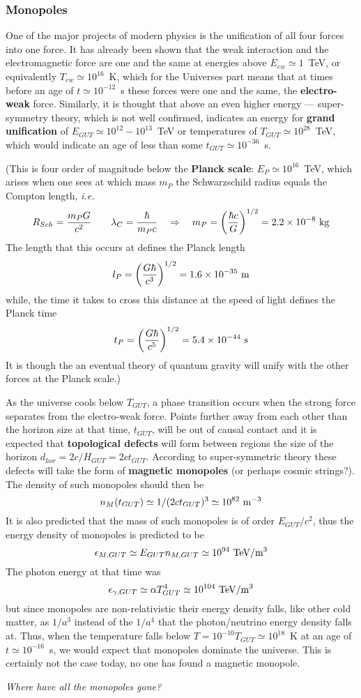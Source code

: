 \documentclass{article}
\begin{document}
\subsubsection*{Monopoles}
One of the major projects of modern physics is the unification of all four forces into one force. It has already been shown that the 
weak interaction and the electromagnetic force are one and the same at energies above $E_{ew}\simeq 1$~TeV, or equivalently 
$T_{ew}\simeq 10^{16}$~K, which for the Universes part means that at times before an age of $t\simeq 10^{-12}$~s these forces were one
and the same, the {\bf electro-weak} force. Similarly, it is thought that above an even higher energy --- super-symmetry theory, which is 
not well confirmed, indicates an energy for {\bf grand unification} of $E_{GUT}\simeq 10^{12} - 10^{13}$~TeV or temperatures of 
$T_{GUT}\simeq 10^{28}$~TeV, which would indicate an age of less than some $t_{GUT}\simeq 10^{-36}$~s. 
\par
(This is four order of magnitude below the {\bf Planck scale}: $E_P\simeq 10^{16}$~TeV, which arises when one sees at which mass $m_P$ the 
Schwarzschild radius equals the Compton length, {\it i.e.}
\[ R_{Sch}={m_{P}G\over c^2} \qquad \lambda_C={\hbar\over m_Pc} \quad \Rightarrow \quad m_P=\left({\hbar c\over G}\right)^{1/2}=2.2\times 10^{-8}~{\rm kg} \]
The length that this occurs at defines the Planck length
\[ l_P=\left({G\hbar\over c^3}\right)^{1/2}=1.6\times 10^{-35}~{\rm m} \]
while, the time it takes to cross this distance at the speed of light defines the Planck time
\[ t_P=\left({G\hbar\over c^5}\right)^{1/2}=5.4\times 10^{-44}~{\rm s} \]
It is though the an eventual theory of quantum gravity will unify with the other forces at the Planck scale.)
\par
As the universe cools below $T_{GUT}$, a phase transition occurs when the strong force separates from the electro-weak force. Points further
away from each other than the horizon size at that time, $t_{GUT}$, will be out of causal contact and it is expected that {\bf topological
defects} will form between regions the size of the horizon $d_{hor}={2 c/H_{GUT}}=2ct_{GUT}$. According to super-symmetric theory these
defects will take the form of {\bf magnetic monopoles} (or perhaps cosmic strings?). The density of such monopoles should then be
\[ n_M(t_{GUT})\simeq{1/(2ct_{GUT})^3}\simeq 10^{82}~{\rm m^{-3}} \]
It is also predicted that the mass of such monopoles is of order $E_{GUT}/c^2$, thus the energy density of monopoles is predicted to be
\[ \epsilon_{M,GUT}\simeq E_{GUT}n_{M,GUT}\simeq 10^{94}~{\rm TeV/m^3} \]
The photon energy at that time was 
\[ \epsilon_{\gamma,GUT}\simeq \alpha T_{GUT}^4\simeq 10^{104}~{\rm TeV/m^3} \]
but since monopoles are non-relativistic their energy density falls, like other cold matter, as $1/a^3$ instead of the $1/a^4$ that the 
photon/neutrino energy density falls at. Thus, when the temperature falls below $T=10^{-10}T_{GUT}\simeq 10^{18}$~K at an age of
$t\simeq 10^{-16}$~s, we would expect that monopoles dominate the universe. This is certainly not the case today, no one has found a
magnetic monopole.
\par
{\it Where have all the monopoles gone?}
\end{document}
